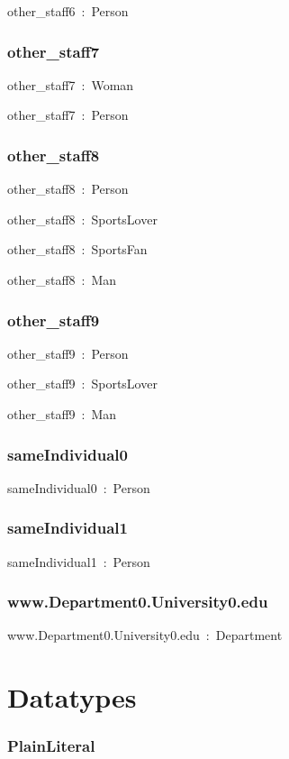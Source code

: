 \documentclass{article}
\begin{document}
other\_staff6~:~Person

\subsubsection*{other\_staff7}

other\_staff7~:~Woman

other\_staff7~:~Person

\subsubsection*{other\_staff8}

other\_staff8~:~Person

other\_staff8~:~SportsLover

other\_staff8~:~SportsFan

other\_staff8~:~Man

\subsubsection*{other\_staff9}

other\_staff9~:~Person

other\_staff9~:~SportsLover

other\_staff9~:~Man

\subsubsection*{sameIndividual0}

sameIndividual0~:~Person

\subsubsection*{sameIndividual1}

sameIndividual1~:~Person

\subsubsection*{www.Department0.University0.edu}

www.Department0.University0.edu~:~Department

\section*{Datatypes}\subsubsection*{PlainLiteral}
\end{document}
